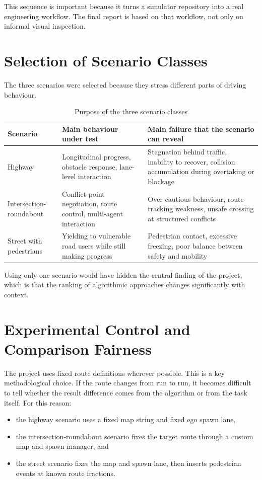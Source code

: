 \documentclass[12pt,a4paper]{report}
\begin{document}
This sequence is important because it turns a simulator repository into a real engineering workflow. The final report is based on that workflow, not only on informal visual inspection.

\section{Selection of Scenario Classes}
The three scenarios were selected because they stress different parts of driving behaviour.

\begin{table}[H]
    \centering
    \small
    \caption{Purpose of the three scenario classes}
    \label{tab:scenario_purpose}
    \begin{tabularx}{\textwidth}{>{\raggedright\arraybackslash}p{2.8cm} X X}
        \toprule
        Scenario & Main behaviour under test & Main failure that the scenario can reveal \\
        \midrule
        Highway & Longitudinal progress, obstacle response, lane-level interaction & Stagnation behind traffic, inability to recover, collision accumulation during overtaking or blockage \\
        Intersection-roundabout & Conflict-point negotiation, route control, multi-agent interaction & Over-cautious behaviour, route-tracking weakness, unsafe crossing at structured conflicts \\
        Street with pedestrians & Yielding to vulnerable road users while still making progress & Pedestrian contact, excessive freezing, poor balance between safety and mobility \\
        \bottomrule
    \end{tabularx}
\end{table}

Using only one scenario would have hidden the central finding of the project, which is that the ranking of algorithmic approaches changes significantly with context.

\section{Experimental Control and Comparison Fairness}
The project uses fixed route definitions wherever possible. This is a key methodological choice. If the route changes from run to run, it becomes difficult to tell whether the result difference comes from the algorithm or from the task itself. For this reason:

\begin{itemize}
    \item the highway scenario uses a fixed map string and fixed ego spawn lane,
    \item the intersection-roundabout scenario fixes the target route through a custom map and spawn manager, and
    \item the street scenario fixes the map and spawn lane, then inserts pedestrian events at known route fractions.
\end{itemize}
\end{document}
